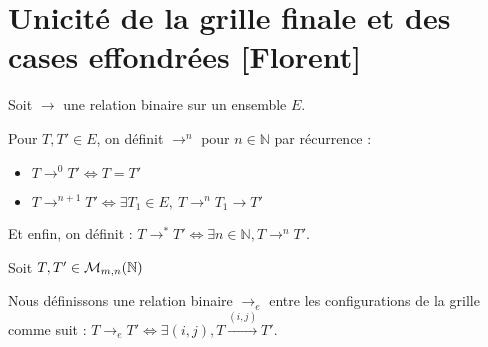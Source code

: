 \section{Unicité de la grille finale et des cases effondrées [Florent]}

Soit $\rightarrow$ une relation binaire sur un ensemble $E$. 

Pour $T,T'\in E$, on définit $\rightarrow^n$ pour $n\in\mathbb{N}$ par récurrence :
\begin{itemize}
\item $T\rightarrow^0 T' \Leftrightarrow T=T'$
\item  $T\rightarrow^{n+1} T' \Leftrightarrow \exists T_1\in E,\ T\rightarrow^n T_1\rightarrow T'$
\end{itemize} 

Et enfin, on définit : $T\rightarrow^* T' \Leftrightarrow \exists n\in\mathbb{N},T\rightarrow^nT'$.

Soit $T,T'\in\mathcal{M}_{m,n}(\mathbb{N})$ %

Nous définissons une relation binaire $\rightarrow_e$ entre les configurations de la grille comme suit : 
$T\rightarrow_e T'\Leftrightarrow \exists(i,j),T\xrightarrow{(i,j)}T'$.




